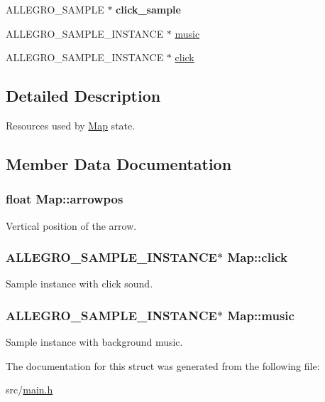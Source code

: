 \begin{DoxyCompactItemize}
\item 
\hypertarget{structMap_abcd15a027ece6075efe4baaf99c7595d}{\-A\-L\-L\-E\-G\-R\-O\-\_\-\-S\-A\-M\-P\-L\-E $\ast$ {\bfseries click\-\_\-sample}}\label{structMap_abcd15a027ece6075efe4baaf99c7595d}

\item 
\-A\-L\-L\-E\-G\-R\-O\-\_\-\-S\-A\-M\-P\-L\-E\-\_\-\-I\-N\-S\-T\-A\-N\-C\-E $\ast$ \hyperlink{structMap_a17ae4f61c1209816b26940d1c8a88f68}{music}
\item 
\-A\-L\-L\-E\-G\-R\-O\-\_\-\-S\-A\-M\-P\-L\-E\-\_\-\-I\-N\-S\-T\-A\-N\-C\-E $\ast$ \hyperlink{structMap_a32370a5fb75fcf7d0bebd210cb2a0985}{click}
\end{DoxyCompactItemize}


\subsection{\-Detailed \-Description}
\-Resources used by \hyperlink{structMap}{\-Map} state. 

\subsection{\-Member \-Data \-Documentation}
\hypertarget{structMap_a4f395f7bdf7bc0782e29e996e87237bb}{
\subsubsection[{arrowpos}]{\setlength{\rightskip}{0pt plus 5cm}float {\bf \-Map\-::arrowpos}}}\label{structMap_a4f395f7bdf7bc0782e29e996e87237bb}
\-Vertical position of the arrow. \hypertarget{structMap_a32370a5fb75fcf7d0bebd210cb2a0985}{
\subsubsection[{click}]{\setlength{\rightskip}{0pt plus 5cm}\-A\-L\-L\-E\-G\-R\-O\-\_\-\-S\-A\-M\-P\-L\-E\-\_\-\-I\-N\-S\-T\-A\-N\-C\-E$\ast$ {\bf \-Map\-::click}}}\label{structMap_a32370a5fb75fcf7d0bebd210cb2a0985}
\-Sample instance with click sound. \hypertarget{structMap_a17ae4f61c1209816b26940d1c8a88f68}{
\subsubsection[{music}]{\setlength{\rightskip}{0pt plus 5cm}\-A\-L\-L\-E\-G\-R\-O\-\_\-\-S\-A\-M\-P\-L\-E\-\_\-\-I\-N\-S\-T\-A\-N\-C\-E$\ast$ {\bf \-Map\-::music}}}\label{structMap_a17ae4f61c1209816b26940d1c8a88f68}
\-Sample instance with background music. 

\-The documentation for this struct was generated from the following file\-:\begin{DoxyCompactItemize}
\item 
src/\hyperlink{main_8h}{main.\-h}\end{DoxyCompactItemize}
